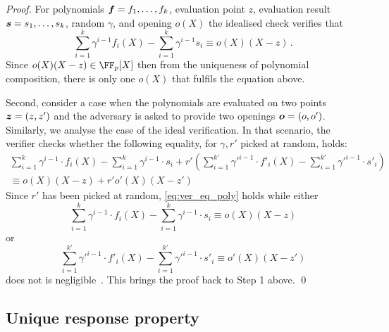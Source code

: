\let\accentvec\vec \documentclass[runningheads,10pt]{llncs}
\def\vec#1{\mathchoice{\mbox{\boldmath$\displaystyle#1$}}
{\mbox{\boldmath$\textstyle#1$}} {\mbox{\boldmath$\scriptstyle#1$}}
{\mbox{\boldmath$\scriptscriptstyle#1$}}}
\begin{document}
\begin{proof}
	For polynomials $\vec{f} = f_1, \ldots, f_k$, evaluation point $z$, evaluation result $\vec{s} = s_1, \ldots, s_k$, random $\gamma$, and opening $o(X)$ the idealised check verifies that
	\begin{equation}
		\sum_{i = 1}^k \gamma^{i - 1} f_i(X) - \sum_{i = 1}^{k} \gamma^{i - 1} s_i \equiv o(X) (X - z)\,.
		\label{eq:pcom_idealised_check}
	\end{equation}
	Since $o(X)(X - z) \in \FF_p[X]$ then from the uniqueness of polynomial composition, there is only one $o(X)$ that fulfils the equation above.

	 Second, consider a case when the polynomials are evaluated on two points $\vec{z} = (z, z')$ and the adversary is asked to provide two openings $\vec{o} = (o, o')$.
	Similarly, we analyse the case of the ideal verification. In that scenario, the verifier checks whether the following equality, for $\gamma, r'$ picked at random, holds:
	\begin{multline}
		\label{eq:ver_eq_poly}
		\sum_{i = 1}^{k} \gamma^{i - 1} \cdot f_i(X) - \sum_{i = 1}^{k} \gamma^{i - 1} \cdot s_i  + r' \left(\sum_{i = 1}^{k'} \gamma'^{i - 1} \cdot f'_i(X) - \sum_{i = 1}^{k'} \gamma'^{i - 1} \cdot s'_i \right)\\
		\equiv o(X)(X - z) + r' o'(X)(X- z')
	\end{multline}
	Since $r'$ has been picked at random, \cref{eq:ver_eq_poly} holds while either
	\[
		\sum_{i = 1}^{k} \gamma^{i - 1} \cdot f_i(X) - \sum_{i = 1}^{k}  \gamma^{i - 1} \cdot s_i \equiv o(X)(X - z)
	\]
	or 
	\[
		\sum_{i = 1}^{k'} \gamma'^{i - 1} \cdot f'_i(X) - \sum_{i = 1}^{k'} \gamma'^{i - 1} \cdot s'_i \equiv o'(X)(X - z')
	\]
	does not is negligible~\cite{EPRINT:GabWilCio19}. This brings the proof back to Step 1 above. 
	\qed
\end{proof}

\subsection{Unique response property}
\end{document}
